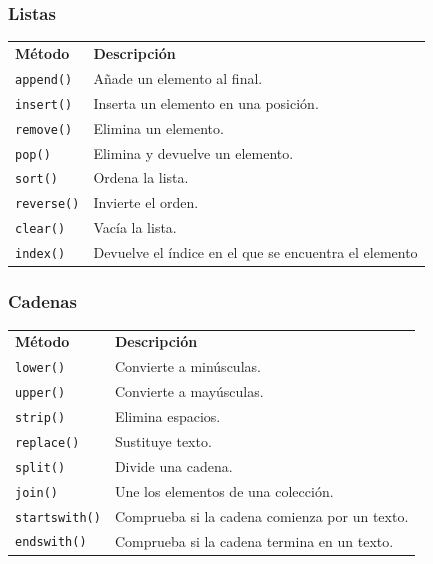 \documentclass[11pt,a5paper,twoside]{book}
\begin{document}
\subsubsection{Listas}

\begin{tcolorbox}
\begin{tabular}{ll}
 \textbf{Método}       &  \textbf{Descripción}                           \\
 {\scriptsize \texttt{append()}}   &  Añade un elemento al final.           \\
 {\scriptsize \texttt{insert()}}   &  Inserta un elemento en una posición.  \\
 {\scriptsize \texttt{remove()}}   &  Elimina un elemento.                  \\
 {\scriptsize \texttt{pop()}}      &  Elimina y devuelve un elemento.       \\
 {\scriptsize \texttt{sort()}}     &  Ordena la lista.                      \\
 {\scriptsize \texttt{reverse()}}  &  Invierte el orden.                    \\
 {\scriptsize \texttt{clear()}}    &  Vacía la lista.                       \\
 {\scriptsize \texttt{index()}}    &  Devuelve el índice en el que se encuentra el elemento  \\
\end{tabular}
\end{tcolorbox}
\subsubsection{Cadenas}

\begin{tcolorbox}
\begin{tabular}{ll}
 \textbf{Método}       &  \textbf{Descripción}              \\
 {\scriptsize \texttt{lower()}}    &  Convierte a minúsculas.  \\
 {\scriptsize \texttt{upper()}}    &  Convierte a mayúsculas.  \\
 {\scriptsize \texttt{strip()}}    &  Elimina espacios.        \\
 {\scriptsize \texttt{replace()}}  &  Sustituye texto.         \\
 {\scriptsize \texttt{split()}}    &  Divide una cadena.       \\
 {\scriptsize \texttt{join()}}     &  Une los elementos de una colección. \\
 {\scriptsize \texttt{startswith()}} &  Comprueba si la cadena comienza por un texto. \\
 {\scriptsize \texttt{endswith()}} &   Comprueba si la cadena termina en un texto. \\
\end{tabular}
\end{tcolorbox}
\end{document}
